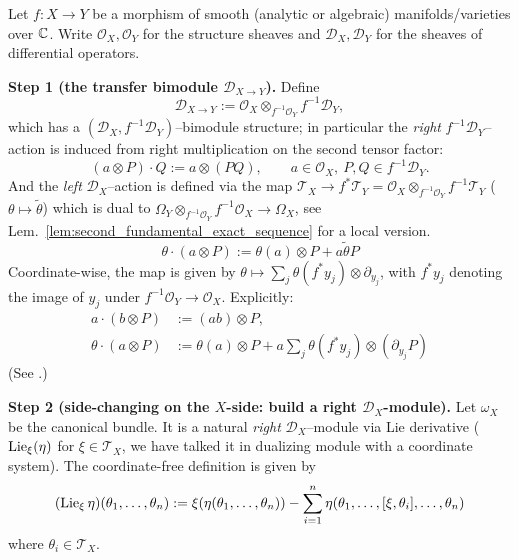 \begin{example}\label{example:side-changing-transfer-bimodules}
    Let $f:X\to Y$ be a morphism of smooth (analytic or algebraic) manifolds/varieties over $\mathbb{C}$.
    Write $\mathcal O_X,\mathcal O_Y$ for the structure sheaves and
    $\mathcal D_X,\mathcal D_Y$ for the sheaves of differential operators.

    \medskip
    \noindent\textbf{Step 1 (the transfer bimodule $\mathcal D_{X\to Y}$).}
    Define
    \[
        \mathcal D_{X\to Y}
        :=\mathcal O_X\otimes_{f^{-1}\mathcal O_Y} f^{-1}\mathcal D_Y,
    \]
    which has a $(\mathcal D_X,f^{-1}\mathcal D_Y)$--bimodule structure; in particular
    the \emph{right} $f^{-1}\mathcal D_Y$--action is induced from right multiplication on the second
    tensor factor:
    \[
        (a\otimes P)\cdot Q := a\otimes (P Q),
        \qquad a\in\mathcal O_X,\ P,Q\in f^{-1}\mathcal D_Y.
    \]
    And the \emph{left} $\mathcal D_X$--action is defined via the map $\mathcal{T}_X \to f^*\mathcal{T}_Y = \mathcal{O}_X \otimes_{f^{-1}\mathcal{O}_Y} f^{-1}\mathcal{T}_Y$ ($\theta \mapsto \widetilde{\theta}$)
    which is dual to $\Omega_{Y} \otimes_{f^{-1}\mathcal O_Y} f^{-1}\mathcal O_X \to \Omega_X$, see Lem.~\ref{lem:second_fundamental_exact_sequence} for a local version.
    \[
        \theta \cdot (a \otimes P) := \theta(a) \otimes P + a \widetilde{\theta} P
    \]
    Coordinate-wise, the map is given by $\theta \mapsto \sum_j \theta(f^* y_j) \otimes \partial_{y_j}$, with $f^*y_j$ denoting the image of $y_j$ under $f^{-1}\mathcal{O}_Y \to \mathcal{O}_X$. Explicitly:
    \begin{align*}
        a \cdot (b \otimes P)      & := (ab) \otimes P,                                                           \\
        \theta \cdot (a \otimes P) & := \theta(a) \otimes P + a \sum_j \theta(f^* y_j) \otimes (\partial_{y_j} P)
    \end{align*}
    (See \cite[Section~1.3]{hotta2008d}.)

    \medskip

    \noindent\textbf{Step 2 (side-changing on the $X$-side: build a right $\mathcal D_X$-module).}
    Let $\omega_X$ be the canonical bundle. It is a natural \emph{right} $\mathcal D_X$--module
    via Lie derivative ($\operatorname{Lie}_\xi(\eta)$ for $\xi\in\mathcal{T}_X$, we have talked it in dualizing module with a coordinate system).
    The coordinate-free definition is given by
    \[
        (\operatorname{Lie}_\xi \eta)(\theta_1, \dots, \theta_n) := \xi(\eta(\theta_1, \dots, \theta_n)) - \sum_{i=1}^n \eta(\theta_1, \dots, [\xi, \theta_i], \dots, \theta_n)
    \]
    where $\theta_i \in \mathcal{T}_X$.


\end{example}
